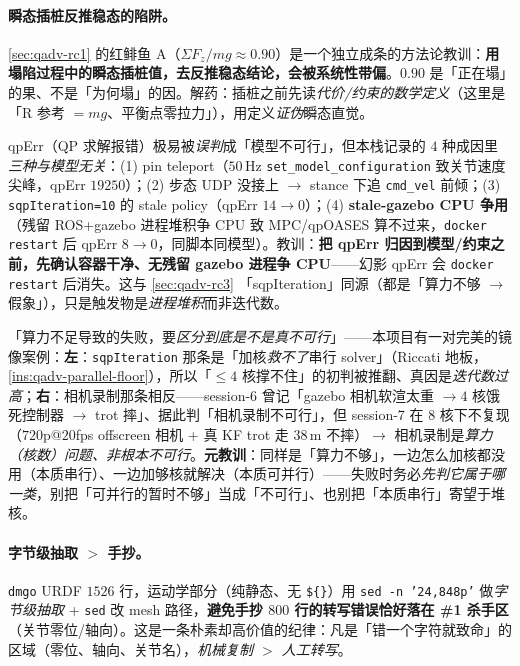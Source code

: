 \paragraph{瞬态插桩反推稳态的陷阱。}
\cref{sec:qadv-rc1} 的红鲱鱼 A（$\Sigma F_z/mg\approx0.90$）是一个独立成条的方法论教训：\textbf{用塌陷过程中的瞬态插桩值，去反推稳态结论，会被系统性带偏}。$0.90$ 是「正在塌」的果、不是「为何塌」的因。解药：插桩之前先读\emph{代价/约束的数学定义}（这里是「R 参考 $=mg$、平衡点零拉力」），用定义\emph{证伪}瞬态直觉。

\begin{insight}\label{ins:qadv-phantom-qperr}
qpErr（QP 求解报错）极易被\emph{误判}成「模型不可行」，但本栈记录的 $4$ 种成因里\emph{三种与模型无关}：(1) pin teleport（$50$\,Hz \texttt{set\_model\_configuration} 致关节速度尖峰，qpErr $19250$）；(2) 步态 UDP 没接上 $\to$ stance 下追 \texttt{cmd\_vel} 前倾；(3) \texttt{sqpIteration=10} 的 stale policy（qpErr $14\to0$）；(4) \textbf{stale-gazebo CPU 争用}（残留 ROS+gazebo 进程堆积争 CPU 致 MPC/qpOASES 算不过来，\texttt{docker restart} 后 qpErr $8\to0$，同脚本同模型）。教训：\textbf{把 qpErr 归因到模型/约束之前，先确认容器干净、无残留 gazebo 进程争 CPU}——幻影 qpErr 会 \texttt{docker restart} 后消失。这与 \cref{sec:qadv-rc3} 「sqpIteration」同源（都是「算力不够 $\to$ 假象」），只是触发物是\emph{进程堆积}而非迭代数。
\end{insight}

\begin{insight}\label{ins:qadv-mirror-pair}
「算力不足导致的失败，要\emph{区分到底是不是真不可行}」——本项目有一对完美的镜像案例：\textbf{左}：\texttt{sqpIteration} 那条是「加核\emph{救不了}串行 solver」（Riccati 地板，\cref{ins:qadv-parallel-floor}），所以「$\le4$ 核撑不住」的初判被推翻、真因是\emph{迭代数过高}；\textbf{右}：相机录制那条相反——session-6 曾记「gazebo 相机软渲太重 $\to4$ 核饿死控制器 $\to$ trot 摔」、据此判「相机录制不可行」，但 session-7 在 $8$ 核下不复现（$720$p@$20$fps offscreen 相机 + 真 KF trot 走 $38$\,m 不摔）$\to$ 相机录制是\emph{算力（核数）问题、非根本不可行}。\textbf{元教训}：同样是「算力不够」，一边怎么加核都没用（本质串行）、一边加够核就解决（本质可并行）——失败时务必\emph{先判它属于哪一类}，别把「可并行的暂时不够」当成「不可行」、也别把「本质串行」寄望于堆核。
\end{insight}

\paragraph{字节级抽取 $>$ 手抄。}
\texttt{dmgo} URDF $1526$ 行，运动学部分（纯静态、无 \texttt{\$\{\}}）用 \texttt{sed -n '24,848p'} 做\emph{字节级抽取} + \texttt{sed} 改 mesh 路径，\textbf{避免手抄 $800$ 行的转写错误恰好落在 \#1 杀手区}（关节零位/轴向）。这是一条朴素却高价值的纪律：凡是「错一个字符就致命」的区域（零位、轴向、关节名），\emph{机械复制 $>$ 人工转写}。

